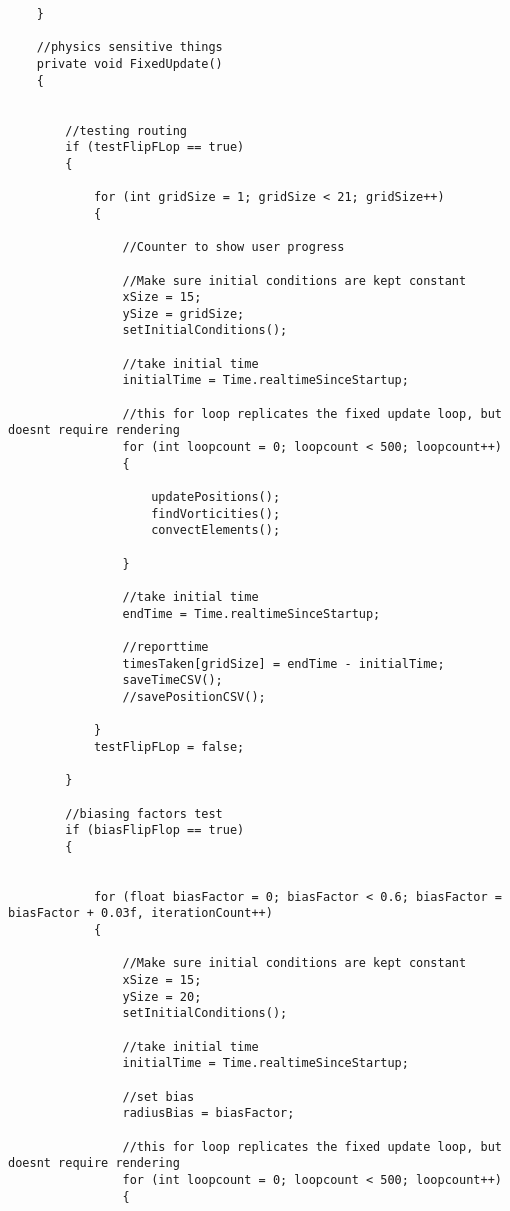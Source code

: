\begin{mdframed}[linecolor=black, topline=true, bottomline=true,
  leftline=false, rightline=false]
\begin{verbatim}
	}

    //physics sensitive things
    private void FixedUpdate()
    {


        //testing routing
        if (testFlipFLop == true)
        {

            for (int gridSize = 1; gridSize < 21; gridSize++)
            {

                //Counter to show user progress

                //Make sure initial conditions are kept constant
                xSize = 15;
                ySize = gridSize;
                setInitialConditions();

                //take initial time
                initialTime = Time.realtimeSinceStartup;

                //this for loop replicates the fixed update loop, but doesnt require rendering
                for (int loopcount = 0; loopcount < 500; loopcount++)
                {

                    updatePositions();
                    findVorticities();
                    convectElements();

                }

                //take initial time
                endTime = Time.realtimeSinceStartup;

                //reporttime
                timesTaken[gridSize] = endTime - initialTime;
                saveTimeCSV();
                //savePositionCSV();

            }
            testFlipFLop = false;

        }

        //biasing factors test
        if (biasFlipFlop == true)
        {


            for (float biasFactor = 0; biasFactor < 0.6; biasFactor = biasFactor + 0.03f, iterationCount++)
            {

                //Make sure initial conditions are kept constant
                xSize = 15;
                ySize = 20;
                setInitialConditions();

                //take initial time
                initialTime = Time.realtimeSinceStartup;

                //set bias
                radiusBias = biasFactor;

                //this for loop replicates the fixed update loop, but doesnt require rendering
                for (int loopcount = 0; loopcount < 500; loopcount++)
                {


\end{verbatim}
\end{mdframed}
